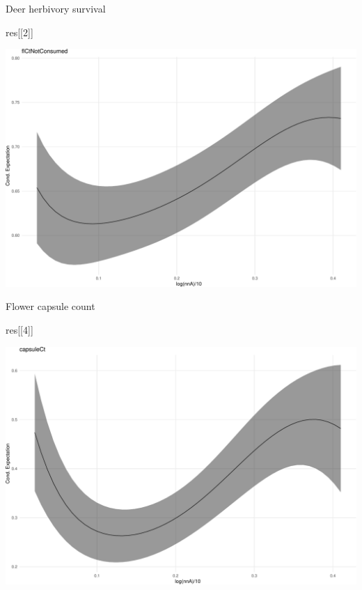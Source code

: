 \documentclass[
  ignorenonframetext,
]{beamer}
\newenvironment{Shaded}{\begin{snugshade}}{\end{snugshade}}
\newcommand{\DecValTok}[1]{\textcolor[rgb]{0.00,0.00,0.81}{#1}}
\newcommand{\NormalTok}[1]{#1}
\begin{document}
\begin{frame}[fragile]{Deer herbivory survival}
\protect\hypertarget{deer-herbivory-survival}{}
\begin{Shaded}
\begin{Highlighting}[]
\NormalTok{res[[}\DecValTok{2}\NormalTok{]]}
\end{Highlighting}
\end{Shaded}

\includegraphics{week14p2_files/figure-beamer/unnamed-chunk-55-1.pdf}
\end{frame}

\begin{frame}[fragile]{Flower capsule count}
\protect\hypertarget{flower-capsule-count}{}
\begin{Shaded}
\begin{Highlighting}[]
\NormalTok{res[[}\DecValTok{4}\NormalTok{]]}
\end{Highlighting}
\end{Shaded}

\includegraphics{week14p2_files/figure-beamer/unnamed-chunk-56-1.pdf}
\end{frame}
\end{document}
